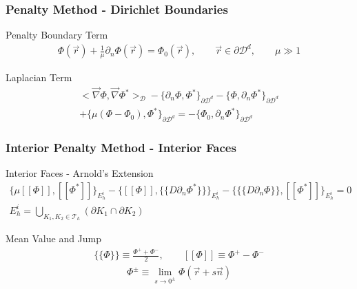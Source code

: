 \documentclass[]{beamer}
\begin{document}
\begin{frame}[t]\frametitle{Penalty Method - Dirichlet Boundaries}
	\begin{block}{Penalty Boundary Term}
		\begin{gather*}
			\Phi (\vec{r}) +\frac{1}{\mu}\partial_n \Phi (\vec{r}) = \Phi_0 (\vec{r}), \qquad \vec{r} \in \partial \mathcal{D}^d, \qquad \mu \gg 1
		\end{gather*}
	\end{block}
	\begin{block}{Laplacian Term}
		\begin{align*}
			\Big<   \vec{\nabla}  \Phi , \vec{\nabla} \Phi^*  \Big>_{\mathcal{D}} - \Big\{    \partial_n \Phi, \Phi^* \Big\}_{\partial \mathcal{D}^d} - \Big\{  \Phi, \partial_n \Phi^* \Big\}_{\partial \mathcal{D}^d} \\ + \Big\{ \mu (\Phi - \Phi_0),  \Phi^* \Big\}_{\partial \mathcal{D}^d} = - \Big\{  \Phi_0, \partial_n \Phi^* \Big\}_{\partial \mathcal{D}^d} 
		\end{align*}
	\end{block}
\end{frame}
\begin{frame}[t]\frametitle{Interior Penalty Method - Interior Faces}
{\small
	\begin{block}{Interior Faces - Arnold's Extension}
     		\begin{gather*}
			   \Big\{ \mu [\![   \Phi ]\!] , [\![  \Phi^* ]\!]\Big\}_{E_h^i} - \Big\{  [\![   \Phi ]\!] , \{\!\{  D \partial_n \Phi^* \}\!\}\Big\}_{E_h^i} -\Big\{ \{\!\{  D \partial_n  \Phi \}\!\} , [\![  \Phi^* ]\!]\Big\}_{E_h^i} = 0 \\
			 E_h^i = \bigcup_{K_1, K_2 \in \mathcal{T}_h} \left(  \partial K_1  \cap  \partial K_2  \right)
        	\end{gather*}
	\end{block}
	\begin{block}{Mean Value and Jump}
     		\begin{gather*}
			 \{\!\{  \Phi \}\!\} \equiv \frac{\Phi^+ + \Phi^-}{2}, \qquad [\![   \Phi ]\!] \equiv \Phi^+ - \Phi^- 
        	\end{gather*}
		\begin{gather*}
			\Phi^{\pm} \equiv \lim_{s \rightarrow 0^{\pm}} \Phi (\vec{r} + s \vec{n})
        	\end{gather*}
	\end{block}
}
\end{frame}
\end{document}
